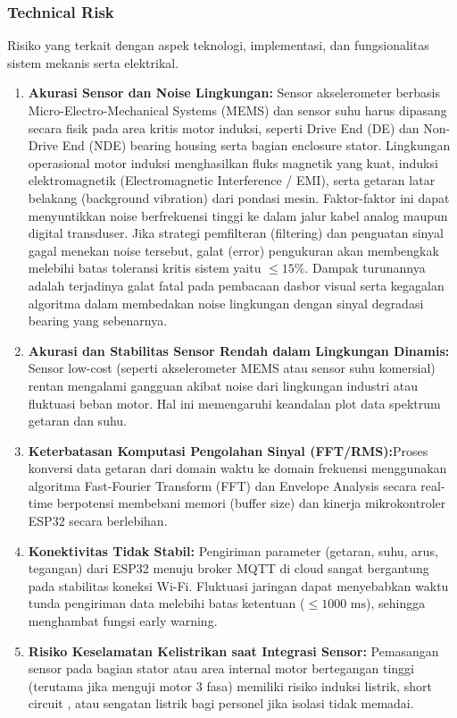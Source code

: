 \documentclass{elsinta}
\begin{document}
\subsubsection*{Technical Risk}
Risiko yang terkait dengan aspek teknologi, implementasi, dan fungsionalitas sistem mekanis serta elektrikal.
\begin{enumerate}
    \item \textbf{Akurasi Sensor dan Noise Lingkungan:} Sensor akselerometer berbasis Micro-Electro-Mechanical Systems (MEMS) dan sensor suhu harus dipasang secara fisik pada area kritis motor induksi, seperti Drive End (DE) dan Non-Drive End (NDE) bearing housing serta bagian enclosure stator. Lingkungan operasional motor induksi menghasilkan fluks magnetik yang kuat, induksi elektromagnetik (Electromagnetic Interference / EMI), serta getaran latar belakang (background vibration) dari pondasi mesin. Faktor-faktor ini dapat menyuntikkan noise berfrekuensi tinggi ke dalam jalur kabel analog maupun digital transduser. Jika strategi pemfilteran (filtering) dan penguatan sinyal gagal menekan noise tersebut, galat (error) pengukuran akan membengkak melebihi batas toleransi kritis sistem yaitu $\le15\%$. Dampak turunannya adalah terjadinya galat fatal pada pembacaan dasbor visual serta kegagalan algoritma dalam membedakan noise lingkungan dengan sinyal degradasi bearing yang sebenarnya. 
    \item \textbf{Akurasi dan Stabilitas Sensor Rendah dalam Lingkungan Dinamis:} Sensor low-cost (seperti akselerometer MEMS atau sensor suhu komersial) rentan mengalami gangguan akibat noise dari lingkungan industri atau fluktuasi beban motor. Hal ini memengaruhi keandalan plot data spektrum getaran dan suhu.
    \item \textbf{Keterbatasan Komputasi Pengolahan Sinyal (FFT/RMS):}Proses konversi data getaran dari domain waktu ke domain frekuensi menggunakan algoritma Fast-Fourier Transform (FFT) dan Envelope Analysis secara real-time berpotensi membebani memori (buffer size) dan kinerja mikrokontroler ESP32 secara berlebihan. 
    \item \textbf{Konektivitas  Tidak Stabil:} Pengiriman parameter (getaran, suhu, arus, tegangan) dari ESP32 menuju broker MQTT di cloud sangat bergantung pada stabilitas koneksi Wi-Fi. Fluktuasi jaringan dapat menyebabkan waktu tunda pengiriman data melebihi batas ketentuan ($\le1000\text{ ms}$), sehingga menghambat fungsi early warning. 
    \item \textbf{Risiko Keselamatan Kelistrikan saat Integrasi Sensor:} Pemasangan sensor pada bagian stator atau area internal motor bertegangan tinggi (terutama jika menguji motor 3 fasa) memiliki risiko induksi listrik, { short circuit } , atau sengatan listrik bagi personel jika isolasi tidak memadai. 
\end{enumerate}
\end{document}

